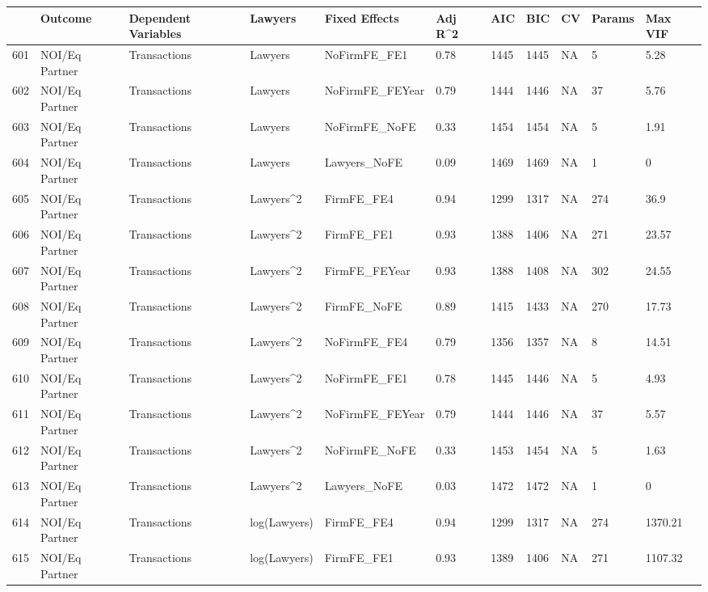 \begin{table}[ht]
\centering
\begin{tabular}{rllllllllll}
  \hline
 & Outcome & Dependent Variables & Lawyers & Fixed Effects & Adj R^2 & AIC & BIC & CV & Params & Max VIF \\ 
  \hline
601 & NOI/Eq Partner & Transactions & Lawyers & NoFirmFE\_FE1 & 0.78 & 1445 & 1445 & NA & 5 & 5.28 \\ 
  602 & NOI/Eq Partner & Transactions & Lawyers & NoFirmFE\_FEYear & 0.79 & 1444 & 1446 & NA & 37 & 5.76 \\ 
  603 & NOI/Eq Partner & Transactions & Lawyers & NoFirmFE\_NoFE & 0.33 & 1454 & 1454 & NA & 5 & 1.91 \\ 
  604 & NOI/Eq Partner & Transactions & Lawyers & Lawyers\_NoFE & 0.09 & 1469 & 1469 & NA & 1 & 0 \\ 
  605 & NOI/Eq Partner & Transactions & Lawyers^2 & FirmFE\_FE4 & 0.94 & 1299 & 1317 & NA & 274 & 36.9 \\ 
  606 & NOI/Eq Partner & Transactions & Lawyers^2 & FirmFE\_FE1 & 0.93 & 1388 & 1406 & NA & 271 & 23.57 \\ 
  607 & NOI/Eq Partner & Transactions & Lawyers^2 & FirmFE\_FEYear & 0.93 & 1388 & 1408 & NA & 302 & 24.55 \\ 
  608 & NOI/Eq Partner & Transactions & Lawyers^2 & FirmFE\_NoFE & 0.89 & 1415 & 1433 & NA & 270 & 17.73 \\ 
  609 & NOI/Eq Partner & Transactions & Lawyers^2 & NoFirmFE\_FE4 & 0.79 & 1356 & 1357 & NA & 8 & 14.51 \\ 
  610 & NOI/Eq Partner & Transactions & Lawyers^2 & NoFirmFE\_FE1 & 0.78 & 1445 & 1446 & NA & 5 & 4.93 \\ 
  611 & NOI/Eq Partner & Transactions & Lawyers^2 & NoFirmFE\_FEYear & 0.79 & 1444 & 1446 & NA & 37 & 5.57 \\ 
  612 & NOI/Eq Partner & Transactions & Lawyers^2 & NoFirmFE\_NoFE & 0.33 & 1453 & 1454 & NA & 5 & 1.63 \\ 
  613 & NOI/Eq Partner & Transactions & Lawyers^2 & Lawyers\_NoFE & 0.03 & 1472 & 1472 & NA & 1 & 0 \\ 
  614 & NOI/Eq Partner & Transactions & log(Lawyers) & FirmFE\_FE4 & 0.94 & 1299 & 1317 & NA & 274 & 1370.21 \\ 
  615 & NOI/Eq Partner & Transactions & log(Lawyers) & FirmFE\_FE1 & 0.93 & 1389 & 1406 & NA & 271 & 1107.32 \\ 

\end{tabular}
\end{table}
